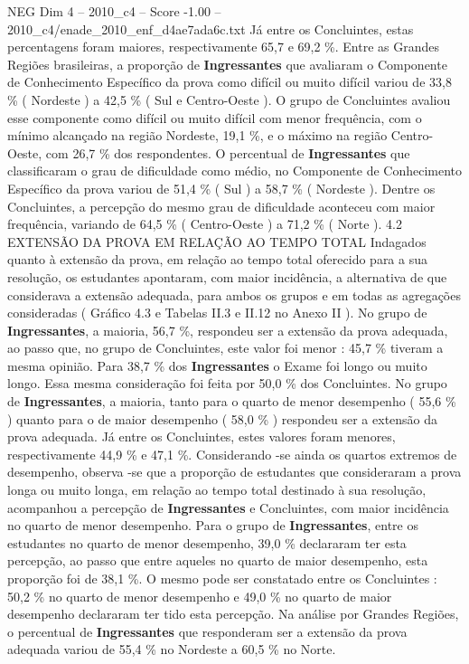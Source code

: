 \begin{textsample}{NEG Dim 4 – 2010\_c4 – Score -1.00 – 2010\_c4/enade\_2010\_enf\_d4ae7ada6c.txt}
Já entre os Concluintes, estas percentagens foram maiores, respectivamente 65,7 e 69,2 \%.
Entre as Grandes Regiões brasileiras, a proporção de \textbf{Ingressantes} que avaliaram o Componente de Conhecimento Específico da prova como difícil ou muito difícil variou de 33,8 \% ( Nordeste ) a 42,5 \% ( Sul e Centro-Oeste ).
O grupo de Concluintes avaliou esse componente como difícil ou muito difícil com menor frequência, com o mínimo alcançado na região Nordeste, 19,1 \%, e o máximo na região Centro-Oeste, com 26,7 \% dos respondentes.
O percentual de \textbf{Ingressantes} que classificaram o grau de dificuldade como médio, no Componente de Conhecimento Específico da prova variou de 51,4 \% ( Sul ) a 58,7 \% ( Nordeste ).
Dentre os Concluintes, a percepção do mesmo grau de dificuldade aconteceu com maior frequência, variando de 64,5 \% ( Centro-Oeste ) a 71,2 \% ( Norte ). 4.2 EXTENSÃO DA PROVA EM RELAÇÃO AO TEMPO TOTAL Indagados quanto à extensão da prova, em relação ao tempo total oferecido para a sua resolução, os estudantes apontaram, com maior incidência, a alternativa de que considerava a extensão adequada, para ambos os grupos e em todas as agregações consideradas ( Gráfico 4.3 e Tabelas II.3 e II.12 no Anexo II ).
No grupo de \textbf{Ingressantes}, a maioria, 56,7 \%, respondeu ser a extensão da prova adequada, ao passo que, no grupo de Concluintes, este valor foi menor : 45,7 \% tiveram a mesma opinião.
Para 38,7 \% dos \textbf{Ingressantes} o Exame foi longo ou muito longo.
Essa mesma consideração foi feita por 50,0 \% dos Concluintes.
No grupo de \textbf{Ingressantes}, a maioria, tanto para o quarto de menor desempenho ( 55,6 \% ) quanto para o de maior desempenho ( 58,0 \% ) respondeu ser a extensão da prova adequada.
Já entre os Concluintes, estes valores foram menores, respectivamente 44,9 \% e 47,1 \%.
Considerando -se ainda os quartos extremos de desempenho, observa -se que a proporção de estudantes que consideraram a prova longa ou muito longa, em relação ao tempo total destinado à sua resolução, acompanhou a percepção de \textbf{Ingressantes} e Concluintes, com maior incidência no quarto de menor desempenho.
Para o grupo de \textbf{Ingressantes}, entre os estudantes no quarto de menor desempenho, 39,0 \% declararam ter esta percepção, ao passo que entre aqueles no quarto de maior desempenho, esta proporção foi de 38,1 \%.
O mesmo pode ser constatado entre os Concluintes : 50,2 \% no quarto de menor desempenho e 49,0 \% no quarto de maior desempenho declararam ter tido esta percepção.
Na análise por Grandes Regiões, o percentual de \textbf{Ingressantes} que responderam ser a extensão da prova adequada variou de 55,4 \% no Nordeste a 60,5 \% no Norte.

\end{textsample}
